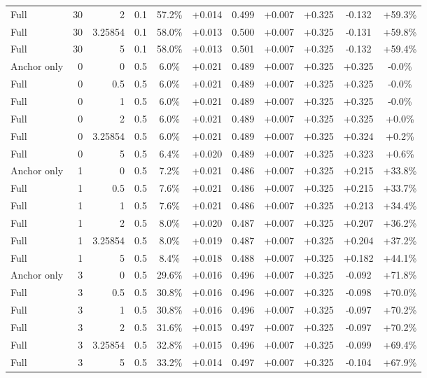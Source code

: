 \begin{table}[htbp]
\begin{tabular}{lrrrccccccc}
Full & 30 & 2 & 0.1 & 57.2\% & +0.014 & 0.499 & +0.007 & +0.325 & -0.132 & +59.3\% \\
Full & 30 & 3.25854 & 0.1 & 58.0\% & +0.013 & 0.500 & +0.007 & +0.325 & -0.131 & +59.8\% \\
Full & 30 & 5 & 0.1 & 58.0\% & +0.013 & 0.501 & +0.007 & +0.325 & -0.132 & +59.4\% \\
Anchor only & 0 & 0 & 0.5 & 6.0\% & +0.021 & 0.489 & +0.007 & +0.325 & +0.325 & -0.0\% \\
Full & 0 & 0.5 & 0.5 & 6.0\% & +0.021 & 0.489 & +0.007 & +0.325 & +0.325 & -0.0\% \\
Full & 0 & 1 & 0.5 & 6.0\% & +0.021 & 0.489 & +0.007 & +0.325 & +0.325 & -0.0\% \\
Full & 0 & 2 & 0.5 & 6.0\% & +0.021 & 0.489 & +0.007 & +0.325 & +0.325 & +0.0\% \\
Full & 0 & 3.25854 & 0.5 & 6.0\% & +0.021 & 0.489 & +0.007 & +0.325 & +0.324 & +0.2\% \\
Full & 0 & 5 & 0.5 & 6.4\% & +0.020 & 0.489 & +0.007 & +0.325 & +0.323 & +0.6\% \\
Anchor only & 1 & 0 & 0.5 & 7.2\% & +0.021 & 0.486 & +0.007 & +0.325 & +0.215 & +33.8\% \\
Full & 1 & 0.5 & 0.5 & 7.6\% & +0.021 & 0.486 & +0.007 & +0.325 & +0.215 & +33.7\% \\
Full & 1 & 1 & 0.5 & 7.6\% & +0.021 & 0.486 & +0.007 & +0.325 & +0.213 & +34.4\% \\
Full & 1 & 2 & 0.5 & 8.0\% & +0.020 & 0.487 & +0.007 & +0.325 & +0.207 & +36.2\% \\
Full & 1 & 3.25854 & 0.5 & 8.0\% & +0.019 & 0.487 & +0.007 & +0.325 & +0.204 & +37.2\% \\
Full & 1 & 5 & 0.5 & 8.4\% & +0.018 & 0.488 & +0.007 & +0.325 & +0.182 & +44.1\% \\
Anchor only & 3 & 0 & 0.5 & 29.6\% & +0.016 & 0.496 & +0.007 & +0.325 & -0.092 & +71.8\% \\
Full & 3 & 0.5 & 0.5 & 30.8\% & +0.016 & 0.496 & +0.007 & +0.325 & -0.098 & +70.0\% \\
Full & 3 & 1 & 0.5 & 30.8\% & +0.016 & 0.496 & +0.007 & +0.325 & -0.097 & +70.2\% \\
Full & 3 & 2 & 0.5 & 31.6\% & +0.015 & 0.497 & +0.007 & +0.325 & -0.097 & +70.2\% \\
Full & 3 & 3.25854 & 0.5 & 32.8\% & +0.015 & 0.496 & +0.007 & +0.325 & -0.099 & +69.4\% \\
Full & 3 & 5 & 0.5 & 33.2\% & +0.014 & 0.497 & +0.007 & +0.325 & -0.104 & +67.9\% \\

\end{tabular}
\end{table}
